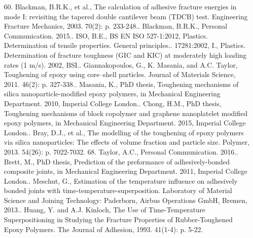 \documentclass[numbers=noendperiod,chapterprefix=on]{icldt} %
\begin{document}
60.	Blackman, B.R.K., et al., The calculation of adhesive fracture energies in mode I: revisiting the tapered double cantilever beam (TDCB) test. Engineering Fracture Mechanics, 2003. 70(2): p. 233-248..	Blackman, B.R.K., Personal Communication. 2015..	ISO, B.E., BS EN ISO 527-1:2012, Plastics. Determination of tensile properties. General principles..	17281:2002, I., Plastics. Determination of fracture toughness (GIC and KIC) at moderately high loading rates (1 m/s). 2002, BSI..	Giannakopoulos, G., K. Masania, and A.C. Taylor, Toughening of epoxy using core–shell particles. Journal of Materials Science, 2011. 46(2): p. 327-338..	Masania, K., PhD thesis, Toughening mechanisms of silica nanoparticle-modified epoxy polymers, in Mechanical Engineering Department. 2010, Imperial College London..	Chong, H.M., PhD thesis, Toughening mechanisms of block copolymer and graphene nanoplatelet modified epoxy polymers, in Mechanical Engineering Department. 2015, Imperial College London..	Bray, D.J., et al., The modelling of the toughening of epoxy polymers via silica nanoparticles: The effects of volume fraction and particle size. Polymer, 2013. 54(26): p. 7022-7032.
68.	Taylor, A.C., Personal Communication. 2016..	Brett, M., PhD thesis, Prediction of the preformance of adhesively-bonded composite joints, in Mechanical Engineering Department. 2011, Imperial College London..	Meschut, G., Estimation of the temperature influence on adhesively bonded joints with time-temperature-superposition. Laboratory of Material Science and Joining Technology: Paderborn, Airbus Operations GmbH, Bremen, 2013..	Huang, Y. and A.J. Kinloch, The Use of Time-Temperature Superpositioning in Studying the Fracture Properties of Rubber-Toughened Epoxy Polymers. The Journal of Adhesion, 1993. 41(1-4): p. 5-22.\newline
\end{document}
